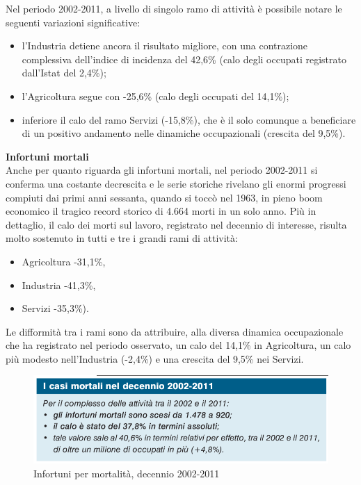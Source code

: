 Nel periodo 2002-2011, a livello di singolo ramo di attività è possibile notare le seguenti variazioni significative:
\begin{itemize}
\item l’Industria detiene ancora il risultato migliore, con una contrazione complessiva dell’indice di incidenza del 42,6\% (calo degli occupati registrato dall’Istat del 2,4\%);
\item l’Agricoltura segue con -25,6\% (calo degli occupati del 14,1\%);
\item inferiore il calo del ramo Servizi (-15,8\%), che è il solo comunque a beneficiare di
un positivo andamento nelle dinamiche occupazionali (crescita del 9,5\%).\\
\end{itemize}


\textbf{Infortuni mortali}\\
Anche per quanto riguarda gli infortuni mortali, nel periodo 2002-2011 si conferma una costante decrescita e le serie storiche rivelano gli enormi progressi compiuti dai primi anni sessanta, quando si toccò nel 1963, in pieno boom economico il tragico record storico di 4.664 morti in un solo anno.
Più in dettaglio, il calo dei morti sul lavoro, registrato nel decennio di interesse, risulta molto
sostenuto in tutti e tre i grandi rami di attività:
\begin{itemize}
\item Agricoltura -31,1\%,
\item Industria -41,3\%,
\item Servizi -35,3\%).\\
\end{itemize}

Le difformità tra i rami sono da attribuire, alla diversa dinamica occupazionale che ha registrato nel periodo osservato, un calo del 14,1\% in Agricoltura, un calo più modesto nell’Industria (-2,4\%) e una crescita del 9,5\% nei Servizi.



\begin{figure}[H]
\centering
\includegraphics[scale=0.5]{images/analisiDiMercato/infortuniDecennioPerMortalita1}
\caption{Infortuni per mortalità, decennio 2002-2011}
\end{figure}

